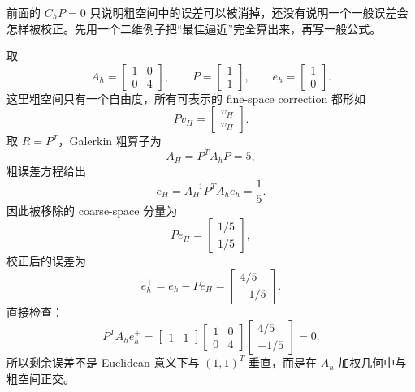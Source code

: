 前面的 $C_hP=0$ 只说明粗空间中的误差可以被消掉，还没有说明一个一般误差会怎样被校正。先用一个二维例子把“最佳逼近”完全算出来，再写一般公式。

取
\begin{equation}
A_h=
\begin{bmatrix}
1&0\\
0&4
\end{bmatrix},
\qquad
P=
\begin{bmatrix}
1\\1
\end{bmatrix},
\qquad
e_h=
\begin{bmatrix}
1\\0
\end{bmatrix}.
\label{eq:twogrid-small-projection-data}
\end{equation}
这里粗空间只有一个自由度，所有可表示的 fine-space correction 都形如
\begin{equation}
Pv_H=
\begin{bmatrix}
v_H\\v_H
\end{bmatrix}.
\end{equation}
取 $R=P^T$，Galerkin 粗算子为
\begin{equation}
A_H=P^TA_hP=5,
\end{equation}
粗误差方程给出
\begin{equation}
e_H
=
A_H^{-1}P^TA_he_h
=
\frac15.
\end{equation}
因此被移除的 coarse-space 分量为
\begin{equation}
Pe_H=
\begin{bmatrix}
1/5\\1/5
\end{bmatrix},
\end{equation}
校正后的误差为
\begin{equation}
e_h^+
=
e_h-Pe_H
=
\begin{bmatrix}
4/5\\-1/5
\end{bmatrix}.
\end{equation}
直接检查：
\begin{equation}
P^TA_he_h^+
=
\begin{bmatrix}1&1\end{bmatrix}
\begin{bmatrix}
1&0\\0&4
\end{bmatrix}
\begin{bmatrix}
4/5\\-1/5
\end{bmatrix}
=0.
\label{eq:twogrid-small-projection-check}
\end{equation}
所以剩余误差不是 Euclidean 意义下与 $(1,1)^T$ 垂直，而是在 $A_h$-加权几何中与粗空间正交。

